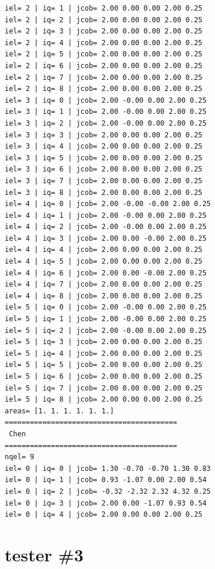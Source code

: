 \begin{tiny}
\begin{verbatim}
iel= 2 | iq= 1 | jcob= 2.00 0.00 0.00 2.00 0.25
iel= 2 | iq= 2 | jcob= 2.00 0.00 0.00 2.00 0.25
iel= 2 | iq= 3 | jcob= 2.00 0.00 0.00 2.00 0.25
iel= 2 | iq= 4 | jcob= 2.00 0.00 0.00 2.00 0.25
iel= 2 | iq= 5 | jcob= 2.00 0.00 0.00 2.00 0.25
iel= 2 | iq= 6 | jcob= 2.00 0.00 0.00 2.00 0.25
iel= 2 | iq= 7 | jcob= 2.00 0.00 0.00 2.00 0.25
iel= 2 | iq= 8 | jcob= 2.00 0.00 0.00 2.00 0.25
iel= 3 | iq= 0 | jcob= 2.00 -0.00 0.00 2.00 0.25
iel= 3 | iq= 1 | jcob= 2.00 -0.00 0.00 2.00 0.25
iel= 3 | iq= 2 | jcob= 2.00 -0.00 0.00 2.00 0.25
iel= 3 | iq= 3 | jcob= 2.00 0.00 0.00 2.00 0.25
iel= 3 | iq= 4 | jcob= 2.00 0.00 0.00 2.00 0.25
iel= 3 | iq= 5 | jcob= 2.00 0.00 0.00 2.00 0.25
iel= 3 | iq= 6 | jcob= 2.00 0.00 0.00 2.00 0.25
iel= 3 | iq= 7 | jcob= 2.00 0.00 0.00 2.00 0.25
iel= 3 | iq= 8 | jcob= 2.00 0.00 0.00 2.00 0.25
iel= 4 | iq= 0 | jcob= 2.00 -0.00 -0.00 2.00 0.25
iel= 4 | iq= 1 | jcob= 2.00 -0.00 0.00 2.00 0.25
iel= 4 | iq= 2 | jcob= 2.00 -0.00 0.00 2.00 0.25
iel= 4 | iq= 3 | jcob= 2.00 0.00 -0.00 2.00 0.25
iel= 4 | iq= 4 | jcob= 2.00 0.00 0.00 2.00 0.25
iel= 4 | iq= 5 | jcob= 2.00 0.00 0.00 2.00 0.25
iel= 4 | iq= 6 | jcob= 2.00 0.00 -0.00 2.00 0.25
iel= 4 | iq= 7 | jcob= 2.00 0.00 0.00 2.00 0.25
iel= 4 | iq= 8 | jcob= 2.00 0.00 0.00 2.00 0.25
iel= 5 | iq= 0 | jcob= 2.00 -0.00 0.00 2.00 0.25
iel= 5 | iq= 1 | jcob= 2.00 -0.00 0.00 2.00 0.25
iel= 5 | iq= 2 | jcob= 2.00 -0.00 0.00 2.00 0.25
iel= 5 | iq= 3 | jcob= 2.00 0.00 0.00 2.00 0.25
iel= 5 | iq= 4 | jcob= 2.00 0.00 0.00 2.00 0.25
iel= 5 | iq= 5 | jcob= 2.00 0.00 0.00 2.00 0.25
iel= 5 | iq= 6 | jcob= 2.00 0.00 0.00 2.00 0.25
iel= 5 | iq= 7 | jcob= 2.00 0.00 0.00 2.00 0.25
iel= 5 | iq= 8 | jcob= 2.00 0.00 0.00 2.00 0.25
areas= [1. 1. 1. 1. 1. 1.]
=========================================
 Chen
=========================================
nqel= 9
iel= 0 | iq= 0 | jcob= 1.30 -0.70 -0.70 1.30 0.83
iel= 0 | iq= 1 | jcob= 0.93 -1.07 0.00 2.00 0.54
iel= 0 | iq= 2 | jcob= -0.32 -2.32 2.32 4.32 0.25
iel= 0 | iq= 3 | jcob= 2.00 0.00 -1.07 0.93 0.54
iel= 0 | iq= 4 | jcob= 2.00 0.00 0.00 2.00 0.25
\end{verbatim}
\end{tiny}

\newpage
\section*{tester \#3}


